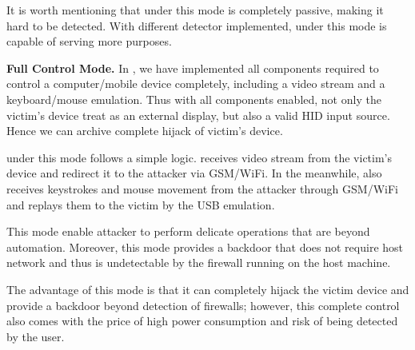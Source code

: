 It is worth mentioning that \tool under this mode is completely passive, making
it hard to be detected. With different detector implemented, \tool
under this mode is capable of serving more purposes.

\textbf{Full Control Mode.} In \tool, we have implemented all components
required to control a computer/mobile device completely, including a video stream
and a keyboard/mouse emulation. Thus with all components enabled, not only
the victim's device treat \tool as an external display, but also a valid HID
input source. Hence we can archive complete hijack of victim's device.

\tool under this mode follows a simple logic. \tool receives video stream
from the victim's device and redirect it to the attacker via GSM/WiFi. In the
meanwhile, \tool also receives keystrokes and mouse movement from the attacker
through GSM/WiFi and replays them to the victim by the USB emulation.

This mode enable attacker to perform delicate operations that are beyond
automation. Moreover, this mode provides a backdoor that does not require host
network and thus is undetectable by the firewall running on the host machine.

The advantage of this mode is that it can completely hijack the victim device
and provide a backdoor beyond detection of firewalls; however, this complete control
also comes with the price of high power consumption and risk of being detected
by the user.

